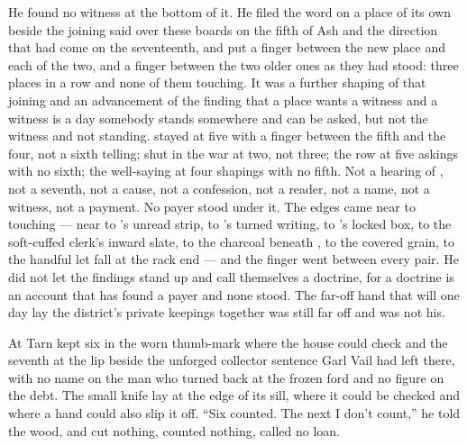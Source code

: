 He found no witness at the bottom of it. He filed the word on a place of its own beside the joining said over these boards on the fifth of Ash and the direction that had come on the seventeenth, and put a finger between the new place and each of the two, and a finger between the two older ones as they had stood: three places in a row and none of them touching. It was a further shaping of that joining and an advancement of the finding that a place wants a witness and a witness is a day somebody stands somewhere and can be asked, but not the witness and not standing.  stayed at five with a finger between the fifth and the four, not a sixth telling;  shut in the war at two, not three; the row at five askings with no sixth; the well-saying at four shapings with no fifth. Not a hearing of , not a seventh, not a cause, not a confession, not a reader, not a name, not a witness, not a payment. No payer stood under it. The edges came near to touching --- near to 's unread strip, to 's turned writing, to 's locked box, to the soft-cuffed clerk's inward slate, to the charcoal beneath , to the covered grain, to the handful let fall at the rack end --- and the finger went between every pair. He did not let the findings stand up and call themselves a doctrine, for a doctrine is an account that has found a payer and none stood. The far-off hand that will one day lay the district's private keepings together was still far off and was not his.

\scenebreak

At  Tarn kept six in the worn thumb-mark where the house could check and the seventh at the lip beside the unforged collector sentence Garl Vail had left there, with no name on the man who turned back at the frozen ford and no figure on the debt. The small knife lay at the edge of its sill, where it could be checked and where a hand could also slip it off. “Six counted. The next I don't count,” he told the wood, and cut nothing, counted nothing, called no loan.

